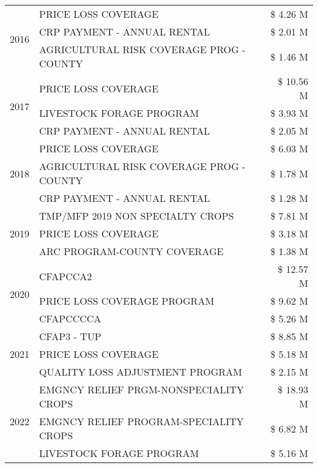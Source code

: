 \begin{tabular}{llr}
\cline{1-3}
\multirow[t]{3}{*}{2016} & PRICE LOSS COVERAGE & \$ 4.26 M \\
 & CRP PAYMENT - ANNUAL RENTAL & \$ 2.01 M \\
 & AGRICULTURAL RISK COVERAGE PROG - COUNTY & \$ 1.46 M \\
\cline{1-3}
\multirow[t]{3}{*}{2017} & PRICE LOSS COVERAGE & \$ 10.56 M \\
 & LIVESTOCK FORAGE PROGRAM & \$ 3.93 M \\
 & CRP PAYMENT - ANNUAL RENTAL & \$ 2.05 M \\
\cline{1-3}
\multirow[t]{3}{*}{2018} & PRICE LOSS COVERAGE & \$ 6.03 M \\
 & AGRICULTURAL RISK COVERAGE PROG - COUNTY & \$ 1.78 M \\
 & CRP PAYMENT - ANNUAL RENTAL & \$ 1.28 M \\
\cline{1-3}
\multirow[t]{3}{*}{2019} & TMP/MFP 2019 NON SPECIALTY CROPS & \$ 7.81 M \\
 & PRICE LOSS COVERAGE & \$ 3.18 M \\
 & ARC PROGRAM-COUNTY COVERAGE & \$ 1.38 M \\
\cline{1-3}
\multirow[t]{3}{*}{2020} & CFAPCCA2 & \$ 12.57 M \\
 & PRICE LOSS COVERAGE PROGRAM & \$ 9.62 M \\
 & CFAPCCCCA & \$ 5.26 M \\
\cline{1-3}
\multirow[t]{3}{*}{2021} & CFAP3 - TUP & \$ 8.85 M \\
 & PRICE LOSS COVERAGE & \$ 5.18 M \\
 & QUALITY LOSS ADJUSTMENT PROGRAM & \$ 2.15 M \\
\cline{1-3}
\multirow[t]{3}{*}{2022} & EMGNCY RELIEF PRGM-NONSPECIALITY CROPS & \$ 18.93 M \\
 & EMGNCY RELIEF PROGRAM-SPECIALITY CROPS & \$ 6.82 M \\
 & LIVESTOCK FORAGE PROGRAM & \$ 5.16 M \\
\cline{1-3}
\bottomrule
\end{tabular}
